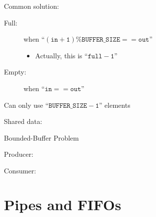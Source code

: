 \begin{frame}
  \begin{block}{Common solution:}
    \begin{description}
    \item[Full:] when ``$\mathtt{(in+1)\%BUFFER\_SIZE == out}$''
      \begin{itemize}
      \item[] Actually, this is ``$\mathtt{full - 1}$''
      \end{itemize}
    \item[Empty:] when ``$\mathtt{in == out}$''
    \end{description}
    Can only use ``$\mathtt{BUFFER\_SIZE-1}$'' elements
  \end{block}  
  \begin{iblock}{Shared data:}
    \begin{center}
    \end{center}
  \end{iblock}
\end{frame}

\begin{frame}{Bounded-Buffer Problem}
  \begin{minipage}{.45\linewidth}
    \begin{iblock}{Producer:}
    \end{iblock}
    \begin{iblock}{Consumer:}
    \end{iblock}
  \end{minipage}\hfill
  \begin{minipage}{.35\linewidth}
  \end{minipage}
\end{frame}

\section{Pipes and FIFOs}
\label{sec:pipes-fifos}

